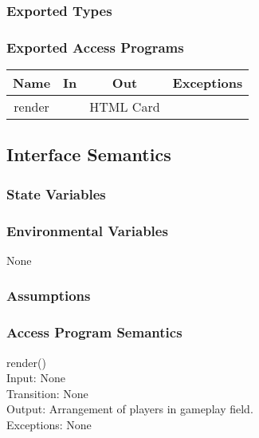 \documentclass[12pt, titlepage]{article}
\begin{document}
\subsubsection{Exported Types}
\subsubsection{Exported Access Programs}
\begin{tabular}[pos]{|c|c|c|c|}
\hline
\textbf{Name}& \textbf{In} & \textbf{Out} & \textbf{Exceptions} \\ \hline
 render & ~  & HTML Card  &~ \\ 
\hline
\end{tabular}


\subsection{Interface Semantics}
\subsubsection{State Variables}

\subsubsection{Environmental Variables}
None
\subsubsection{Assumptions}

\subsubsection{Access Program Semantics}

\noindent render()\\
Input: None\\
Transition: None\\
Output: Arrangement of players in gameplay field. \\
Exceptions: None \\
\end{document}
